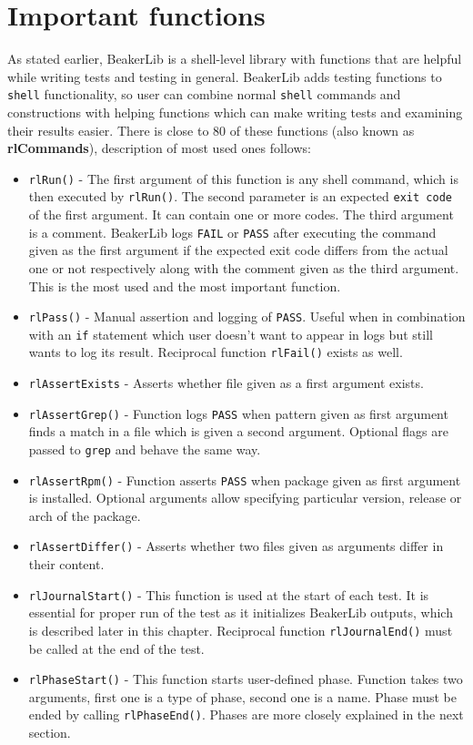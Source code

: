 \section{Important functions}
As stated earlier, BeakerLib is a shell-level library with functions that are helpful while writing tests and testing in general.
BeakerLib adds testing functions to \texttt{shell} functionality, so user can combine normal \texttt{shell} commands and constructions with helping functions which can make writing tests and examining their results easier. There is close to 80 of these functions (also known as \textbf{rlCommands}), description of most used ones follows:
\begin{itemize}
\item \texttt{rlRun()} - The first argument of this function is any shell command, which is then executed by \texttt{rlRun()}. The second parameter is an expected \texttt{exit code} of the first argument. It can contain one or more codes. The third argument is a comment. BeakerLib logs \texttt{FAIL} or \texttt{PASS} after executing the command given as the first argument if the expected exit code differs from the actual one or not respectively along with the comment given as the third argument. This is the most used and the most important function.
\item \texttt{rlPass()} - Manual assertion and logging of \texttt{PASS}. Useful when in combination with an \texttt{if} statement which user doesn't want to appear in logs but still wants to log its result. Reciprocal function \texttt{rlFail()} exists as well.
\item \texttt{rlAssertExists} - Asserts whether file given as a first argument exists.
\item \texttt{rlAssertGrep()} - Function logs \texttt{PASS} when pattern given as first argument finds a match in a file which is given a second argument. Optional flags are passed to \texttt{grep} and behave the same way.
\item \texttt{rlAssertRpm()} - Function asserts \texttt{PASS} when package given as first argument is installed.  Optional arguments allow specifying particular version, release or arch of the package.
\item \texttt{rlAssertDiffer()} - Asserts whether two files given as arguments differ in their content. 
\item \texttt{rlJournalStart()} - This function is used at the start of each test. It is essential for proper run of the test as it initializes BeakerLib outputs, which is described later in this chapter. Reciprocal function \texttt{rlJournalEnd()} must be called at the end of the test.
\item \texttt{rlPhaseStart()} - This function starts user-defined phase. Function takes two arguments, first one is a type of phase, second one is a name. Phase must be ended by calling \texttt{rlPhaseEnd()}. Phases are more closely explained in the next section.
\end{itemize}


